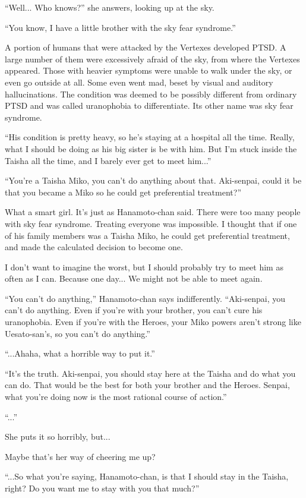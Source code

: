 ``Well... Who knows?'' she answers, looking up at the sky.

``You know, I have a little brother with the sky fear syndrome.''

A portion of humans that were attacked by the Vertexes developed PTSD. A large number of them were excessively afraid of the sky, from where the Vertexes appeared. Those with heavier symptoms were unable to walk under the sky, or even go outside at all. Some even went mad, beset by visual and auditory hallucinations. The condition was deemed to be possibly different from ordinary PTSD and was called uranophobia to differentiate. Its other name was sky fear syndrome.

``His condition is pretty heavy, so he's staying at a hospital all the time. Really, what I should be doing as his big sister is be with him. But I'm stuck inside the Taisha all the time, and I barely ever get to meet him...''

``You're a Taisha Miko, you can't do anything about that. Aki-senpai, could it be that you became a Miko so he could get preferential treatment?''

What a smart girl. It's just as Hanamoto-chan said. There were too many people with sky fear syndrome. Treating everyone was impossible. I thought that if one of his family members was a Taisha Miko, he could get preferential treatment, and made the calculated decision to become one.

I don't want to imagine the worst, but I should probably try to meet him as often as I can. Because one day... We might not be able to meet again.

``You can't do anything,''  Hanamoto-chan says indifferently.  ``Aki-senpai, you can't do anything. Even if you're with your brother, you can't cure his uranophobia. Even if you're with the Heroes, your Miko powers aren't strong like Uesato-san's, so you can't do anything.''

``...Ahaha, what a horrible way to put it.''

``It's the truth. Aki-senpai, you should stay here at the Taisha and do what you can do. That would be the best for both your brother and the Heroes. Senpai, what you're doing now is the most rational course of action.''

``...''

She puts it so horribly, but...

Maybe that's her way of cheering me up?

``...So what you're saying, Hanamoto-chan, is that I should stay in the Taisha, right? Do you want me to stay with you that much?''


